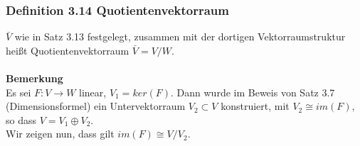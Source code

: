 \documentclass{scrartcl}
\begin{document}
\subsubsection{Definition 3.14 Quotientenvektorraum}
\(\bar{V}\) wie in Satz 3.13 festgelegt, zusammen mit der dortigen Vektorraumstruktur hei\ss{}t Quotientenvektorraum \(\bar{V} = V/W\).\\
\\
\textbf{Bemerkung}\\
Es sei \(F : V \to W\) linear, \(V_1 = ker(F)\). Dann wurde im Beweis von Satz 3.7 (Dimensionsformel) ein Untervektorraum \(V_2 \subset V\) konstruiert, mit \(V_2 \cong im(F)\), so dass \(V = V_1 \oplus V_2\).\\
Wir zeigen nun, dass gilt \(im(F) \cong V/V_2\).
\end{document}

